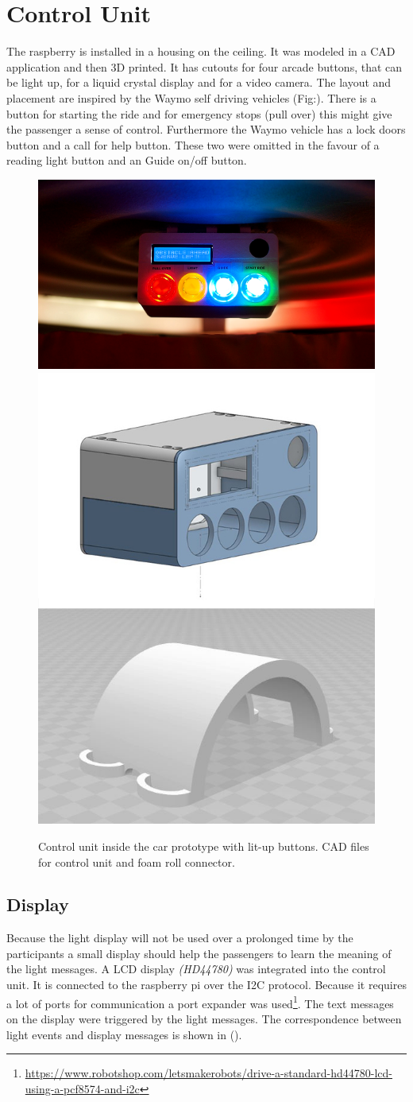 \section{Control Unit}
The raspberry is installed in a housing on the ceiling. It was modeled in a CAD application and then 3D printed. It has cutouts for four arcade buttons, that can be light up, for a liquid crystal display and for a video camera. The layout and placement are inspired by the Waymo self driving vehicles (Fig:). There is a button for starting the ride and for emergency stops (pull over) this might give the passenger a sense of control. Furthermore the Waymo vehicle has a lock doors button and a call for help button. These two were omitted in the favour of a reading light button and an Guide on/off button. 

\begin{figure}
\includegraphics[height=0.38\textwidth]{fig/monitor.png}\hfill\includegraphics[height=0.38\textwidth]{fig/boxes.jpg}
\caption[Control Unit]{Control unit inside the car prototype with lit-up buttons. CAD files for control unit and foam roll connector.}
    \label{fig:boxes}

\end{figure}

\subsection{Display}
\label{ssec:display}
Because the light display will not be used over a prolonged time by the participants a small display should help the passengers to learn the meaning of the light messages. A LCD display \emph{(HD44780)} was integrated into the control unit. It is connected to the raspberry pi over the I2C protocol. Because it requires a lot of ports for communication 
a port expander was used\footnote{\url{https://www.robotshop.com/letsmakerobots/drive-a-standard-hd44780-lcd-using-a-pcf8574-and-i2c}}. The text messages on the display were triggered by the light messages. The correspondence between light events and display messages is shown in ().

